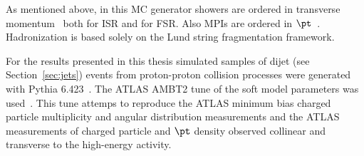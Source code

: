 As mentioned above, in this MC generator showers are ordered in transverse momentum~\cite{Pythia_partonshowers} both for ISR and for FSR. Also MPIs are ordered in $\pt$~\cite{Pythia_mpi}. Hadronization is based solely on the Lund string fragmentation framework.

For the results presented in this thesis simulated samples of dijet (see Section~\ref{sec:jets}) events from proton-proton collision processes were generated  with {\sc Pythia} 6.423~\cite{PYTHIA6}. The ATLAS AMBT2 tune of the soft model parameters was used~\cite{Pythia_MC11tune}. This tune attemps to reproduce the ATLAS minimum bias charged particle multiplicity and angular distribution measurements and the ATLAS measurements of charged particle and $\pt$ density observed collinear and transverse to the high-energy activity.

